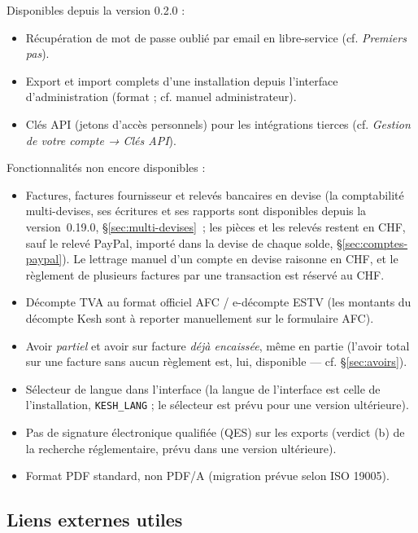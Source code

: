 \documentclass[a4paper,11pt,oneside]{article}
\begin{document}
Disponibles depuis la version 0.2.0 :

\begin{itemize}
    \item Récupération de mot de passe oublié par email en libre-service (cf. \emph{Premiers pas}).
    \item Export et import complets d'une installation depuis l'interface d'administration (format  ; cf. manuel administrateur).
    \item Clés API (jetons d'accès personnels) pour les intégrations tierces (cf. \emph{Gestion de votre compte → Clés API}).
\end{itemize}

Fonctionnalités non encore disponibles :

\begin{itemize}
    \item Factures, factures fournisseur et relevés bancaires en devise (la comptabilité multi-devises, ses écritures et ses rapports sont disponibles depuis la version~0.19.0, \S\ref{sec:multi-devises}~; les pièces et les relevés restent en CHF, sauf le relevé PayPal, importé dans la devise de chaque solde, \S\ref{sec:comptes-paypal}). Le lettrage manuel d'un compte en devise raisonne en CHF, et le règlement de plusieurs factures par une transaction est réservé au CHF.
    \item Décompte TVA au format officiel AFC / e-décompte ESTV (les montants du décompte Kesh sont à reporter manuellement sur le formulaire AFC).
    \item Avoir \emph{partiel} et avoir sur facture \emph{déjà encaissée}, même en partie (l'avoir total sur une facture sans aucun règlement est, lui, disponible — cf. \S\ref{sec:avoirs}).
    \item Sélecteur de langue dans l'interface (la langue de l'interface est celle de l'installation, \texttt{KESH\_LANG} ; le sélecteur est prévu pour une version ultérieure).
    \item Pas de signature électronique qualifiée (QES) sur les exports (verdict (b) de la recherche réglementaire, prévu dans une version ultérieure).
    \item Format PDF standard, non PDF/A (migration prévue selon ISO 19005).
\end{itemize}

\subsection{Liens externes utiles}
\end{document}
